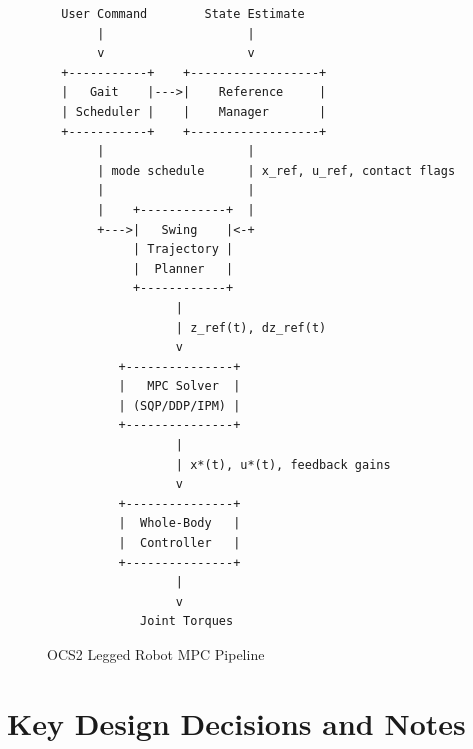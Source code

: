 \documentclass[11pt,a4paper]{article}
\begin{document}
\begin{figure}[h]
	\centering
	\begin{verbatim}
  User Command        State Estimate
       |                    |
       v                    v
  +-----------+    +------------------+
  |   Gait    |--->|    Reference     |
  | Scheduler |    |    Manager       |
  +-----------+    +------------------+
       |                    |
       | mode schedule      | x_ref, u_ref, contact flags
       |                    |
       |    +------------+  |
       +--->|   Swing    |<-+
            | Trajectory |
            |  Planner   |
            +------------+
                  |
                  | z_ref(t), dz_ref(t)
                  v
          +---------------+
          |   MPC Solver  |
          | (SQP/DDP/IPM) |
          +---------------+
                  |
                  | x*(t), u*(t), feedback gains
                  v
          +---------------+
          |  Whole-Body   |
          |  Controller   |
          +---------------+
                  |
                  v
             Joint Torques
\end{verbatim}
	\caption{OCS2 Legged Robot MPC Pipeline}
\end{figure}


\section{Key Design Decisions and Notes}
\end{document}
